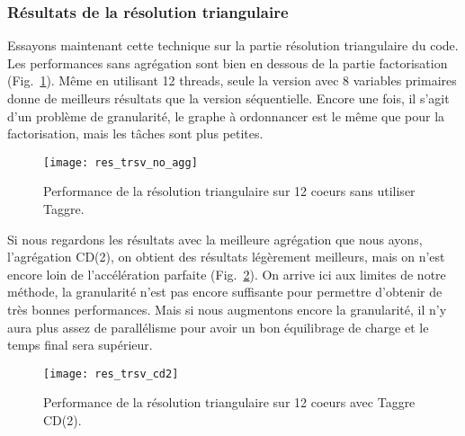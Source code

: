 \subsubsection{Résultats de la résolution triangulaire}
Essayons maintenant cette technique sur la partie résolution triangulaire du code.
%
Les performances sans agrégation sont bien en dessous de la partie factorisation (Fig.~\ref{fig:res_trsv_no_agg}).
%
Même en utilisant 12 threads, seule la version avec 8 variables primaires donne de meilleurs résultats que la version séquentielle.
%
Encore une fois, il s'agit d'un problème de granularité, le graphe à ordonnancer est le même que pour la factorisation, mais les tâches sont plus petites.

\begin{figure}[!h]
  \centering
  \texttt{[image: res\_trsv\_no\_agg]}
  \caption{Performance de la résolution triangulaire sur 12 coeurs sans utiliser Taggre.}
  \label{fig:res_trsv_no_agg}
\end{figure}

Si nous regardons les résultats avec la meilleure agrégation que nous ayons, l'agrégation CD(2), on obtient des résultats légèrement meilleurs, mais on n'est encore loin de l'accélération parfaite (Fig.~\ref{fig:res_trsv_cd2}).
%
On arrive ici aux limites de notre méthode, la granularité n'est pas encore suffisante pour permettre d'obtenir de très bonnes performances.
%
Mais si nous augmentons encore la granularité, il n'y aura plus assez de parallélisme pour avoir un bon équilibrage de charge et le temps final sera supérieur.

\begin{figure}[!h]
  \centering
  \texttt{[image: res\_trsv\_cd2]}
  \caption{Performance de la résolution triangulaire sur 12 coeurs avec Taggre CD(2).}
  \label{fig:res_trsv_cd2}
\end{figure}

